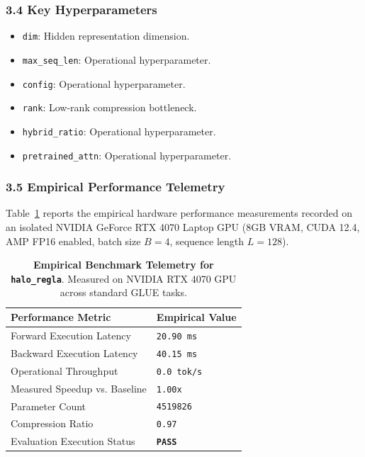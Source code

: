 \subsubsection*{3.4 Key Hyperparameters}
\begin{itemize}
    \item \texttt{dim}: Hidden representation dimension.
    \item \texttt{max\_seq\_len}: Operational hyperparameter.
    \item \texttt{config}: Operational hyperparameter.
    \item \texttt{rank}: Low-rank compression bottleneck.
    \item \texttt{hybrid\_ratio}: Operational hyperparameter.
    \item \texttt{pretrained\_attn}: Operational hyperparameter.
\end{itemize}

\subsubsection*{3.5 Empirical Performance Telemetry}
Table~\ref{tab:telemetry_halo\_regla} reports the empirical hardware performance measurements recorded on an isolated NVIDIA GeForce RTX 4070 Laptop GPU (8GB VRAM, CUDA 12.4, AMP FP16 enabled, batch size $B=4$, sequence length $L=128$).

\begin{table}[h]
\centering
\small
\caption{\textbf{Empirical Benchmark Telemetry for \texttt{halo\_regla}}. Measured on NVIDIA RTX 4070 GPU across standard GLUE tasks.}
\label{tab:telemetry_halo\_regla}
\begin{tabularx}{\columnwidth}{lX}
\toprule
\textbf{Performance Metric} & \textbf{Empirical Value} \\
\midrule
Forward Execution Latency & \texttt{20.90 ms} \\
Backward Execution Latency & \texttt{40.15 ms} \\
Operational Throughput & \texttt{0.0 tok/s} \\
Measured Speedup vs. Baseline & \texttt{1.00x} \\
Parameter Count & \texttt{4519826} \\
Compression Ratio & \texttt{0.97} \\
Evaluation Execution Status & \textbf{\texttt{PASS}} \\
\bottomrule
\end{tabularx}
\end{table}

